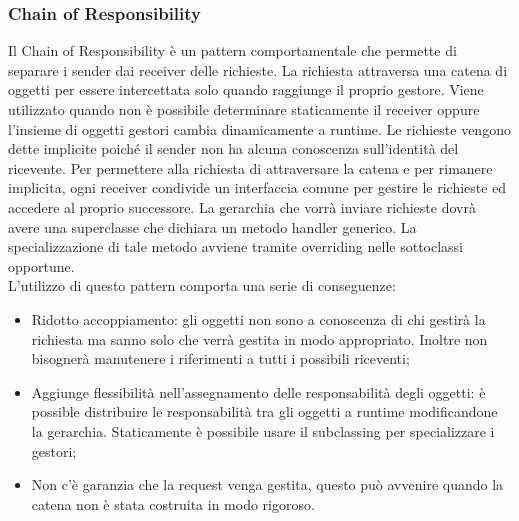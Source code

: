 \documentclass[12pt,a4paper]{article}
\begin{document}
\subsubsection{Chain of Responsibility}
Il Chain of Responsibility è un pattern comportamentale che permette di separare i sender dai receiver delle richieste. La richiesta attraversa una catena di oggetti per essere intercettata solo quando raggiunge il proprio gestore. Viene utilizzato quando non è possibile determinare staticamente il receiver oppure l’insieme di oggetti gestori cambia dinamicamente a runtime. Le richieste vengono dette implicite poiché il sender non ha alcuna conoscenza sull’identità del ricevente. Per permettere alla richiesta di attraversare la catena e per rimanere implicita, ogni receiver condivide un interfaccia comune per gestire le richieste ed accedere al proprio successore. La gerarchia che vorrà inviare richieste dovrà avere una superclasse che dichiara un metodo handler generico. La specializzazione di tale metodo avviene tramite overriding nelle sottoclassi opportune.\\
L’utilizzo di questo pattern comporta una serie di conseguenze:
\begin{itemize}
	\item Ridotto accoppiamento: gli oggetti non sono a conoscenza di chi gestirà la richiesta ma sanno solo che verrà gestita in modo appropriato. Inoltre non bisognerà manutenere i riferimenti a tutti i possibili riceventi;
	\item Aggiunge flessibilità nell’assegnamento delle responsabilità degli oggetti: è possible distribuire le responsabilità tra gli oggetti a runtime modificandone la gerarchia. Staticamente è possibile usare il subclassing per specializzare i gestori;
	\item Non c’è garanzia che la request venga gestita, questo può avvenire quando la catena non è stata costruita in modo rigoroso.
\end{itemize}
\end{document}
